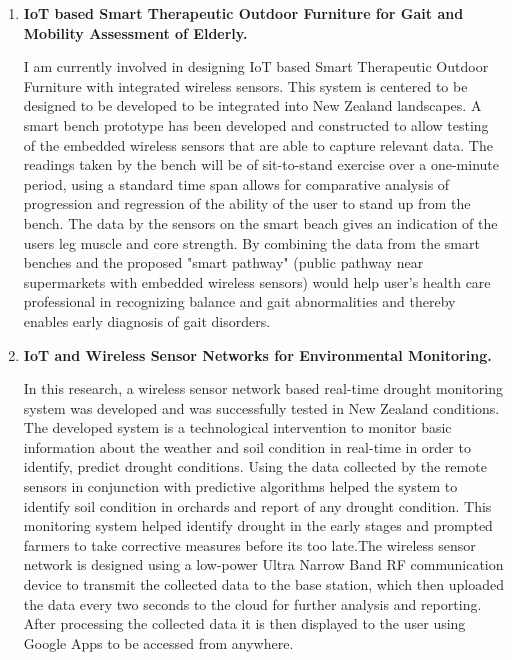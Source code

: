\documentclass[11pt,a4paper,sans]{moderncv} %
\begin{document}
\begin{enumerate}
\item \textbf{IoT based Smart Therapeutic Outdoor Furniture for Gait
and Mobility Assessment of Elderly.}\par I am currently involved in designing IoT based Smart Therapeutic Outdoor Furniture with integrated wireless sensors. This system is centered to be designed to be developed to be integrated into New Zealand landscapes. A smart bench prototype has been developed and constructed to allow testing of the embedded wireless sensors that are able to capture relevant data. The readings taken by the bench will be of sit-to-stand exercise over a one-minute period, using a standard time span allows for comparative analysis of progression and regression of the ability of the user to stand up from the bench. The data by the sensors on the smart beach gives an indication of the users leg muscle and core strength. By combining the data from the smart benches and the proposed "smart pathway" (public pathway near supermarkets with embedded wireless sensors)  would help user's health care professional in recognizing balance and gait abnormalities and thereby enables early diagnosis of gait disorders.
  \item \textbf{IoT and Wireless Sensor Networks for Environmental Monitoring.} \par In this research,  a wireless sensor network based real-time drought monitoring system was developed and was successfully tested in New Zealand conditions. The developed system is a technological intervention to monitor basic information about the weather and soil condition in real-time in order to identify, predict drought conditions. Using the data collected by the remote sensors in conjunction with predictive algorithms helped the system to identify soil condition in orchards and report of any drought condition. This monitoring system helped identify drought in the early stages and prompted farmers to take corrective measures before its too late.The wireless sensor network is designed using a low-power Ultra Narrow Band RF communication device to transmit the collected data to the base station, which then uploaded the data every two seconds to the cloud for further analysis and reporting. After processing the collected data it is then displayed to the user using Google Apps to be accessed from anywhere.  

\end{enumerate}
\end{document}
